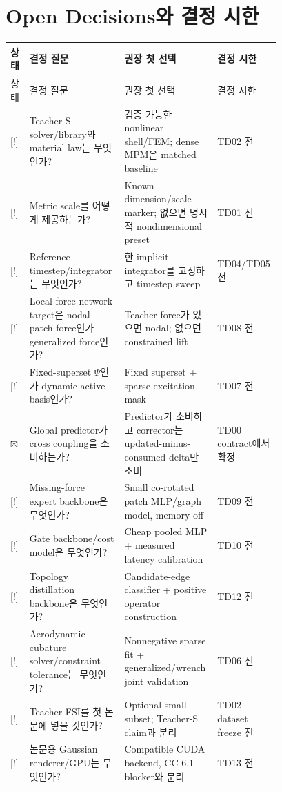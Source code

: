 \documentclass[10pt,a4paper]{article}
\newcommand{\done}{\textcolor{DoneGreen}{\(\boxtimes\)}}
\newcommand{\blocked}{\textcolor{BlockRed}{[!]}}
\begin{document}
\section{Open Decisions와 결정 시한}

\begin{longtable}{L{0.06\linewidth}L{0.32\linewidth}L{0.23\linewidth}L{0.17\linewidth}}
\toprule
상태 & 결정 질문 & 권장 첫 선택 & 결정 시한 \\
\midrule
\endfirsthead
\toprule
상태 & 결정 질문 & 권장 첫 선택 & 결정 시한 \\
\midrule
\endhead
\blocked & Teacher-S solver/library와 material law는 무엇인가? & 검증 가능한 nonlinear shell/FEM; dense MPM은 matched baseline & TD02 전 \\
\blocked & Metric scale를 어떻게 제공하는가? & Known dimension/scale marker; 없으면 명시적 nondimensional preset & TD01 전 \\
\blocked & Reference timestep/integrator는 무엇인가? & 한 implicit integrator를 고정하고 timestep sweep & TD04/TD05 전 \\
\blocked & Local force network target은 nodal patch force인가 generalized force인가? & Teacher force가 있으면 nodal; 없으면 constrained lift & TD08 전 \\
\blocked & Fixed-superset \(\Psi\)인가 dynamic active basis인가? & Fixed superset + sparse excitation mask & TD07 전 \\
\done & Global predictor가 cross coupling을 소비하는가? & Predictor가 소비하고 corrector는 updated-minus-consumed delta만 소비 & TD00 contract에서 확정 \\
\blocked & Missing-force expert backbone은 무엇인가? & Small co-rotated patch MLP/graph model, memory off & TD09 전 \\
\blocked & Gate backbone/cost model은 무엇인가? & Cheap pooled MLP + measured latency calibration & TD10 전 \\
\blocked & Topology distillation backbone은 무엇인가? & Candidate-edge classifier + positive operator construction & TD12 전 \\
\blocked & Aerodynamic cubature solver/constraint tolerance는 무엇인가? & Nonnegative sparse fit + generalized/wrench joint validation & TD06 전 \\
\blocked & Teacher-FSI를 첫 논문에 넣을 것인가? & Optional small subset; Teacher-S claim과 분리 & TD02 dataset freeze 전 \\
\blocked & 논문용 Gaussian renderer/GPU는 무엇인가? & Compatible CUDA backend, CC 6.1 blocker와 분리 & TD13 전 \\
\bottomrule
\end{longtable}
\end{document}
